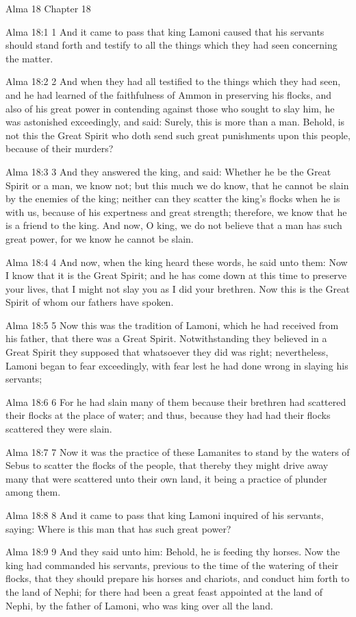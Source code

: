 Alma 18
Chapter 18

Alma 18:1
 1 And it came to pass that king Lamoni caused that his servants
should stand forth and testify to all the things which they had
seen concerning the matter.

Alma 18:2
 2 And when they had all testified to the things which they had
seen, and he had learned of the faithfulness of Ammon in
preserving his flocks, and also of his great power in contending
against those who sought to slay him, he was astonished
exceedingly, and said: Surely, this is more than a man. Behold,
is not this the Great Spirit who doth send such great punishments
upon this people, because of their murders?

Alma 18:3
 3 And they answered the king, and said: Whether he be the Great
Spirit or a man, we know not; but this much we do know, that he
cannot be slain by the enemies of the king; neither can they
scatter the king's flocks when he is with us, because of his
expertness and great strength; therefore, we know that he is a
friend to the king. And now, O king, we do not believe that a
man has such great power, for we know he cannot be slain.

Alma 18:4
 4 And now, when the king heard these words, he said unto them:
Now I know that it is the Great Spirit; and he has come down at
this time to preserve your lives, that I might not slay you as I
did your brethren. Now this is the Great Spirit of whom our
fathers have spoken.

Alma 18:5
 5 Now this was the tradition of Lamoni, which he had received
from his father, that there was a Great Spirit. Notwithstanding
they believed in a Great Spirit they supposed that whatsoever
they did was right; nevertheless, Lamoni began to fear
exceedingly, with fear lest he had done wrong in slaying his
servants;

Alma 18:6
 6 For he had slain many of them because their brethren had
scattered their flocks at the place of water; and thus, because
they had had their flocks scattered they were slain.

Alma 18:7
 7 Now it was the practice of these Lamanites to stand by the
waters of Sebus to scatter the flocks of the people, that thereby
they might drive away many that were scattered unto their own
land, it being a practice of plunder among them.

Alma 18:8
 8 And it came to pass that king Lamoni inquired of his servants,
saying: Where is this man that has such great power?

Alma 18:9
 9 And they said unto him: Behold, he is feeding thy horses. Now
the king had commanded his servants, previous to the time of the
watering of their flocks, that they should prepare his horses and
chariots, and conduct him forth to the land of Nephi; for there
had been a great feast appointed at the land of Nephi, by the
father of Lamoni, who was king over all the land.

